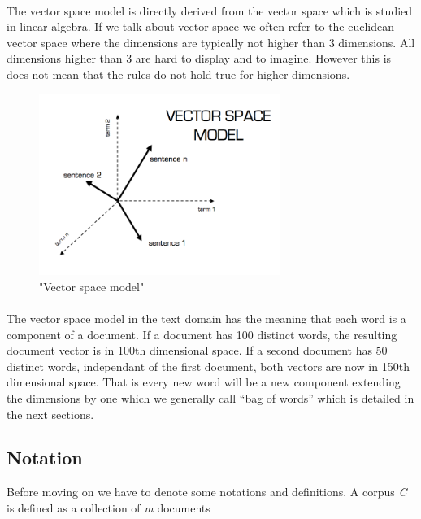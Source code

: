   \paragraph{}
    The vector space model is directly derived from the vector space which is studied in linear algebra. If we talk about vector space we often refer to the euclidean vector space where the dimensions are typically not higher than 3 dimensions. All dimensions higher than 3 are hard to display and to imagine. However this is does not mean that the rules do not hold true for higher dimensions.

  \begin{figure}[h!]
    \centering
      \includegraphics[width=0.7\textwidth]{vsm.png}
      \caption{"Vector space model"}
      \label{vsm_pic}
  \end{figure}

  \paragraph{}
    The vector space model in the text domain has the meaning that each word is a component of a document. If a document has 100 distinct words, the resulting document vector is in 100th dimensional space. If a second document has 50 distinct words, independant of the first document, both vectors are now in 150th dimensional space. That is every new word will be a new component extending the dimensions by one which we generally call ``bag of words'' which is detailed in the next sections.

  \subsection{Notation}
    Before moving on we have to denote some notations and definitions. 
    A corpus \emph{C} is defined as a collection of \emph{m} documents

